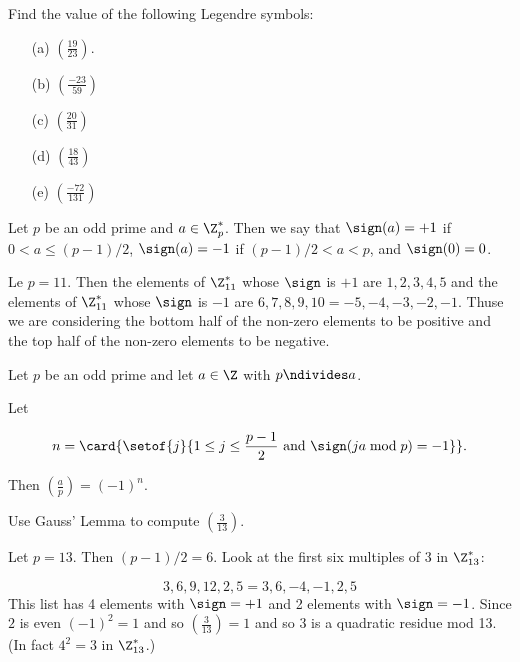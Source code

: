 \documentclass[oneside,12pt]{amsart}
\begin{document}
\begin{homework}
Find the value of the following Legendre symbols:
\begin{enumerate}
\item[(a)] $\left(\frac{19}{23} \right)$.
\item[(b)] $\left(\frac{-23}{59} \right)$ 
\item[(c)] $\left(\frac{20}{31} \right)$  
\item[(d)] $\left(\frac{18}{43} \right)$  
\item[(e)] $\left(\frac{-72}{131} \right)$
\end{enumerate}
\end{homework}

\begin{definition}
Let $p$ be an odd prime and $a\in\Z^*_p$. Then we say that $\sign(a)=+1$ if $0<a\leq (p-1)/2$,
$\sign(a) = -1$ if $(p-1)/2 < a < p$, and $\sign(0)=0$.
\end{definition}

\begin{example}
Le $p=11$. Then the elements of $\Z^*_{11}$ whose $\sign$ is $+1$ are $1,2,3,4,5$ and the elements
of $\Z^*_{11}$ whose $\sign$ is $-1$ are $6,7,8,9,10 = -5,-4,-3,-2,-1.$ Thuse we
are considering the bottom half of the non-zero elements to be positive and the top half of the
non-zero elements to be negative.
\end{example}

\begin{theorem}
\label{GaussLemma}
Let $p$ be an odd prime and let $a\in\Z$ with $p\ndivides a$.

Let

$$n=\card{\setof{j}{1\leq j\leq \frac{p-1}{2} \text{ and } \sign(ja \bmod p) = -1}}.$$

Then $\left(\frac{a}{p} \right) = (-1)^n$.
\end{theorem}

\begin{example} Use Gauss' Lemma to compute $\left(\frac{3}{13} \right)$.

Let $p=13$. Then $(p-1)/2=6$. Look at the first six multiples of $3$ in $\Z^*_{13}$:

$$
3,6,9,12, 2,5 = 3,6,-4,-1,2,5
$$
This list has 4 elements with $\sign=+1$ and 2 elements with $\sign=-1$. Since $2$ is even $(-1)^2=1$ and so
$\left(\frac{3}{13} \right)=1$ and so 3 is a quadratic residue mod 13. (In fact $4^2=3$ in $\Z^*_{13}$.)
\end{example}
\end{document}
